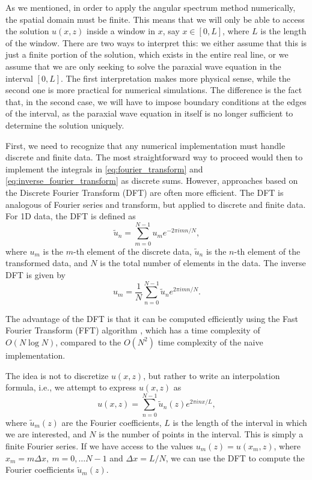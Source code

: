 \documentclass[openany,a4paper,oneside,11pt]{article}
\begin{document}
As we mentioned, in order to apply the angular spectrum method numerically, the spatial domain must be finite. This means that we will only be able to access the solution $u(x, z)$ inside a window in $x$, say $x \in [0, L]$, where $L$ is the length of the window. There are two ways to interpret this: we either assume that this is just a finite portion of the solution, which exists in the entire real line, or we assume that we are only seeking to solve the paraxial wave equation in the interval $[0, L]$. The first interpretation makes more physical sense, while the second one is more practical for numerical simulations. The difference is the fact that, in the second case, we will have to impose boundary conditions at the edges of the interval, as the paraxial wave equation in itself is no longer sufficient to determine the solution uniquely.

First, we need to recognize that any numerical implementation must handle discrete and finite data. The most straightforward way to proceed would then to implement the integrals in \eqref{eq:fourier_transform} and \eqref{eq:inverse_fourier_transform} as discrete sums. However, approaches based on the Discrete Fourier Transform (DFT) are often more efficient. The DFT is analogous of Fourier series and transform, but applied to discrete and finite data. For 1D data, the DFT is defined as
\begin{equation}
    \tilde{u}_n = \sum_{m=0}^{N-1} u_m e^{-2\pi i mn/N},
\end{equation}
where $u_m$ is the $m$-th element of the discrete data, $\tilde{u}_n$ is the $n$-th element of the transformed data, and $N$ is the total number of elements in the data. The inverse DFT is given by
\begin{equation}
    u_m = \frac{1}{N} \sum_{n=0}^{N-1} \tilde{u}_n e^{2\pi i mn/N}.
\end{equation}

The advantage of the DFT is that it can be computed efficiently using the Fast Fourier Transform (FFT) algorithm \cite{cooley1965algorithm}, which has a time complexity of $O(N \log N)$, compared to the $O(N^2)$ time complexity of the naive implementation.

The idea is not to discretize $u(x,z)$, but rather to write an interpolation formula, i.e., we attempt to express $u(x,z)$ as
\begin{equation}
\label{eq:interpolation}
    u(x,z) = \sum_{n=0}^{N-1} \tilde{u}_n(z) e^{2\pi i n x/L},
\end{equation}
where $\tilde{u}_m(z)$ are the Fourier coefficients, $L$ is the length of the interval in which we are interested, and $N$ is the number of points in the interval. This is simply a finite Fourier series. If we have access to the values $u_m(z) = u(x_m,z)$, where $x_m = m \Delta x, \ m=0, \ldots N-1$ and $\Delta x = L / N$, we can use the DFT to compute the Fourier coefficients $\tilde{u}_m(z)$.
\end{document}
